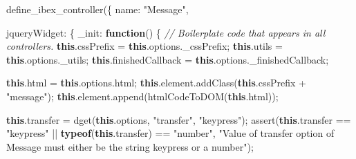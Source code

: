 \documentclass[
]{article}
\newenvironment{Shaded}{}{}
\newcommand{\AttributeTok}[1]{\textcolor[rgb]{0.49,0.56,0.16}{#1}}
\newcommand{\CommentTok}[1]{\textcolor[rgb]{0.38,0.63,0.69}{\textit{#1}}}
\newcommand{\DataTypeTok}[1]{\textcolor[rgb]{0.56,0.13,0.00}{#1}}
\newcommand{\FunctionTok}[1]{\textcolor[rgb]{0.02,0.16,0.49}{#1}}
\newcommand{\KeywordTok}[1]{\textcolor[rgb]{0.00,0.44,0.13}{\textbf{#1}}}
\newcommand{\NormalTok}[1]{#1}
\newcommand{\OperatorTok}[1]{\textcolor[rgb]{0.40,0.40,0.40}{#1}}
\newcommand{\StringTok}[1]{\textcolor[rgb]{0.25,0.44,0.63}{#1}}
\begin{document}
\begin{Shaded}
\begin{Highlighting}[]
\FunctionTok{define\_ibex\_controller}\NormalTok{(\{}
\DataTypeTok{name}\OperatorTok{:} \StringTok{"Message"}\OperatorTok{,}

\DataTypeTok{jqueryWidget}\OperatorTok{:}\NormalTok{ \{}
    \DataTypeTok{\_init}\OperatorTok{:} \KeywordTok{function}\NormalTok{() \{}
        \CommentTok{// Boilerplate code that appears in all controllers.}
        \KeywordTok{this}\OperatorTok{.}\AttributeTok{cssPrefix} \OperatorTok{=} \KeywordTok{this}\OperatorTok{.}\AttributeTok{options}\OperatorTok{.}\AttributeTok{\_cssPrefix}\OperatorTok{;}
        \KeywordTok{this}\OperatorTok{.}\AttributeTok{utils} \OperatorTok{=} \KeywordTok{this}\OperatorTok{.}\AttributeTok{options}\OperatorTok{.}\AttributeTok{\_utils}\OperatorTok{;}
        \KeywordTok{this}\OperatorTok{.}\AttributeTok{finishedCallback} \OperatorTok{=} \KeywordTok{this}\OperatorTok{.}\AttributeTok{options}\OperatorTok{.}\AttributeTok{\_finishedCallback}\OperatorTok{;}

        \KeywordTok{this}\OperatorTok{.}\AttributeTok{html} \OperatorTok{=} \KeywordTok{this}\OperatorTok{.}\AttributeTok{options}\OperatorTok{.}\AttributeTok{html}\OperatorTok{;}
        \KeywordTok{this}\OperatorTok{.}\AttributeTok{element}\OperatorTok{.}\FunctionTok{addClass}\NormalTok{(}\KeywordTok{this}\OperatorTok{.}\AttributeTok{cssPrefix} \OperatorTok{+} \StringTok{"message"}\NormalTok{)}\OperatorTok{;}
        \KeywordTok{this}\OperatorTok{.}\AttributeTok{element}\OperatorTok{.}\FunctionTok{append}\NormalTok{(}\FunctionTok{htmlCodeToDOM}\NormalTok{(}\KeywordTok{this}\OperatorTok{.}\AttributeTok{html}\NormalTok{))}\OperatorTok{;}

        \KeywordTok{this}\OperatorTok{.}\AttributeTok{transfer} \OperatorTok{=} \FunctionTok{dget}\NormalTok{(}\KeywordTok{this}\OperatorTok{.}\AttributeTok{options}\OperatorTok{,} \StringTok{"transfer"}\OperatorTok{,} \StringTok{"keypress"}\NormalTok{)}\OperatorTok{;}
        \FunctionTok{assert}\NormalTok{(}\KeywordTok{this}\OperatorTok{.}\AttributeTok{transfer} \OperatorTok{==} \StringTok{"keypress"} \OperatorTok{||} \KeywordTok{typeof}\NormalTok{(}\KeywordTok{this}\OperatorTok{.}\AttributeTok{transfer}\NormalTok{) }\OperatorTok{==} \StringTok{"number"}\OperatorTok{,}
               \StringTok{"Value of \textquotesingle{}transfer\textquotesingle{} option of Message must either be the string \textquotesingle{}keypress\textquotesingle{} or a number"}\NormalTok{)}\OperatorTok{;}


\end{Highlighting}
\end{Shaded}
\end{document}
